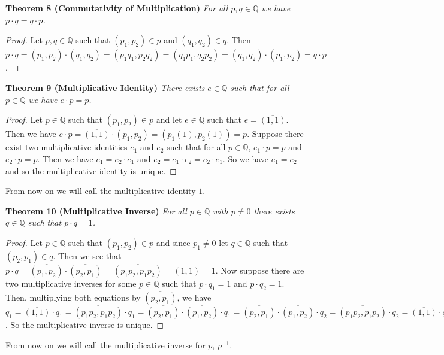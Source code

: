 \documentclass{article}
\begin{document}
\begin{flushleft}
\textbf{Theorem 8 (Commutativity of Multiplication)}
\textsl{For all $p,q \in \mathbb{Q}$ we have $p \cdot q = q \cdot p$.}
\begin{proof}
Let $p,q \in \mathbb{Q}$ such that $(p_1,p_2) \in p$ and $(q_1,q_2) \in q$. Then $p \cdot q = \overline{(p_1,p_2)} \cdot \overline{(q_1,q_2)} = \overline{(p_1q_1,p_2q_2)} = \overline{(q_1p_1,q_2p_2)} = \overline{(q_1,q_2)} \cdot \overline{(p_1,p_2)} = q \cdot p$.
\end{proof}

\textbf{Theorem 9 (Multiplicative Identity)}
\textsl{There exists $e \in \mathbb{Q}$ such that for all $p \in \mathbb{Q}$ we have $e \cdot p=p$.}
\begin{proof}
Let $p \in \mathbb{Q}$ such that $(p_1,p_2) \in p$ and let $e \in \mathbb{Q}$ such that $e = \overline{(1,1)}$. Then we have $e \cdot p = \overline{(1,1)} \cdot \overline{(p_1,p_2)} = \overline{(p_1(1),p_2(1))} = p$. Suppose there exist two multiplicative identities $e_1$ and $e_2$ such that for all $p \in \mathbb{Q}$, $e_1 \cdot p = p$ and $e_2 \cdot p = p$. Then we have $e_1 = e_2 \cdot e_1$ and $e_2 = e_1 \cdot e_2 = e_2 \cdot e_1$. So we have $e_1 = e_2$ and so the multiplicative identity is unique.
\end{proof}

From now on we will call the multiplicative identity $1$.\newline

\textbf{Theorem 10 (Multiplicative Inverse)}
\textsl{For all $p \in \mathbb{Q}$ with $p \neq 0$ there exists $q \in \mathbb{Q}$ such that $p \cdot q=1$.}
\begin{proof}
Let $p \in \mathbb{Q}$ such that $(p_1,p_2) \in p$ and since $p_1 \neq 0$ let $q \in \mathbb{Q}$ such that $(p_2,p_1) \in q$. Then we see that $p \cdot q = \overline{(p_1,p_2)} \cdot \overline{(p_2,p_1)} = \overline{(p_1p_2,p_1p_2)}=\overline{(1,1)}=1$. Now suppose there are two multiplicative inverses for some $p \in \mathbb{Q}$ such that $p \cdot q_1=1$ and $p \cdot q_2=1$. Then, multiplying both equations by $\overline{(p_2,p_1)}$, we have $q_1=\overline{(1,1)} \cdot q_1=\overline{(p_1p_2,p_1p_2)} \cdot q_1=\overline{(p_2,p_1)} \cdot \overline{(p_1,p_2)} \cdot q_1=\overline{(p_2,p_1)} \cdot \overline{(p_1,p_2)} \cdot q_2=\overline{(p_1p_2,p_1p_2)} \cdot q_2=\overline{(1,1)} \cdot q_2=q_2$. So the multiplicative inverse is unique.
\end{proof}

From now on we will call the multiplicative inverse for $p$, $p^{-1}$.\newline


\end{flushleft}
\end{document}
